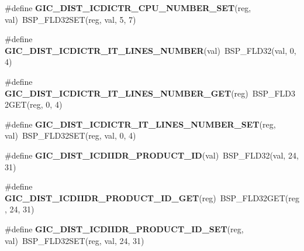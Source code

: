 \begin{DoxyCompactItemize}
\item 
\mbox{\label{arm-gic-regs_8h_ac047097c2af6a678c6023e31aedb317b}} 
\#define {\bfseries G\+I\+C\+\_\+\+D\+I\+S\+T\+\_\+\+I\+C\+D\+I\+C\+T\+R\+\_\+\+C\+P\+U\+\_\+\+N\+U\+M\+B\+E\+R\+\_\+\+S\+ET}(reg,  val)~B\+S\+P\+\_\+\+F\+L\+D32\+S\+ET(reg, val, 5, 7)
\item 
\mbox{\label{arm-gic-regs_8h_a840bd21741fd1636ad21ffa642b2ba6c}} 
\#define {\bfseries G\+I\+C\+\_\+\+D\+I\+S\+T\+\_\+\+I\+C\+D\+I\+C\+T\+R\+\_\+\+I\+T\+\_\+\+L\+I\+N\+E\+S\+\_\+\+N\+U\+M\+B\+ER}(val)~B\+S\+P\+\_\+\+F\+L\+D32(val, 0, 4)
\item 
\mbox{\label{arm-gic-regs_8h_a5f84bfec177584565ee661b302c3bfca}} 
\#define {\bfseries G\+I\+C\+\_\+\+D\+I\+S\+T\+\_\+\+I\+C\+D\+I\+C\+T\+R\+\_\+\+I\+T\+\_\+\+L\+I\+N\+E\+S\+\_\+\+N\+U\+M\+B\+E\+R\+\_\+\+G\+ET}(reg)~B\+S\+P\+\_\+\+F\+L\+D32\+G\+ET(reg, 0, 4)
\item 
\mbox{\label{arm-gic-regs_8h_a19d0527d75b42aeb1295c398ab683ee1}} 
\#define {\bfseries G\+I\+C\+\_\+\+D\+I\+S\+T\+\_\+\+I\+C\+D\+I\+C\+T\+R\+\_\+\+I\+T\+\_\+\+L\+I\+N\+E\+S\+\_\+\+N\+U\+M\+B\+E\+R\+\_\+\+S\+ET}(reg,  val)~B\+S\+P\+\_\+\+F\+L\+D32\+S\+ET(reg, val, 0, 4)
\item 
\mbox{\label{arm-gic-regs_8h_afdd43a4e484c472f5a14134abf52df30}} 
\#define {\bfseries G\+I\+C\+\_\+\+D\+I\+S\+T\+\_\+\+I\+C\+D\+I\+I\+D\+R\+\_\+\+P\+R\+O\+D\+U\+C\+T\+\_\+\+ID}(val)~B\+S\+P\+\_\+\+F\+L\+D32(val, 24, 31)
\item 
\mbox{\label{arm-gic-regs_8h_ada586ecb88ed088deb71e19af1dfa2dc}} 
\#define {\bfseries G\+I\+C\+\_\+\+D\+I\+S\+T\+\_\+\+I\+C\+D\+I\+I\+D\+R\+\_\+\+P\+R\+O\+D\+U\+C\+T\+\_\+\+I\+D\+\_\+\+G\+ET}(reg)~B\+S\+P\+\_\+\+F\+L\+D32\+G\+ET(reg, 24, 31)
\item 
\mbox{\label{arm-gic-regs_8h_aa7efd6f09d32ef97bbb2930ba08ecfe4}} 
\#define {\bfseries G\+I\+C\+\_\+\+D\+I\+S\+T\+\_\+\+I\+C\+D\+I\+I\+D\+R\+\_\+\+P\+R\+O\+D\+U\+C\+T\+\_\+\+I\+D\+\_\+\+S\+ET}(reg,  val)~B\+S\+P\+\_\+\+F\+L\+D32\+S\+ET(reg, val, 24, 31)
\item 
\mbox{\label{arm-gic-regs_8h_aef182546716bf119144af4ef54f25a35}} 

\end{DoxyCompactItemize}
